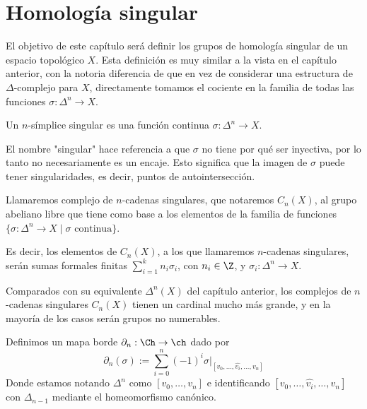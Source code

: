 \chapter{Homología singular}

El objetivo de este capítulo será definir los grupos de homología singular de un espacio topológico $X$. Esta definición es muy similar a la vista en el capítulo anterior, con la notoria diferencia de que en vez de considerar una estructura de $\Delta$-complejo para $X$, directamente tomamos el cociente en la familia de todas las funciones $\sigma:\Delta^n\to X$.

\begin{df}
    Un $n$-símplice singular es una función continua $\sigma:\Delta^n\to X$.
\end{df}

El nombre "singular" hace referencia a que $\sigma$ no tiene por qué ser inyectiva, por lo tanto no necesariamente es un encaje. Esto significa que la imagen de $\sigma$ puede tener singularidades, es decir, puntos de autointersección. \br


\begin{df}
    Llamaremos complejo de $n$-cadenas singulares, que notaremos $C_n(X)$, al grupo abeliano libre que tiene como base a los elementos de la familia de funciones $\{\sigma:\Delta^n\to X \;\vert\; \sigma \text{ continua}\}$. \br

    Es decir, los elementos de $C_n(X)$, a los que llamaremos $n$-cadenas singulares, serán sumas formales finitas $\sum_{i=1}^k n_i\sigma_i$, con $n_i\in\Z$, y $\sigma_i:\Delta^n\to X$.
\end{df}

Comparados con su equivalente $\Delta^n(X)$ del capítulo anterior, los complejos de $n$-cadenas singulares $C_n(X)$ tienen un cardinal mucho más grande, y en la mayoría de los casos serán  grupos no numerables. \br

\begin{df}
    Definimos un mapa borde $\partial_n:\Ch\to\ch$ dado por $$\partial_n(\sigma):= \sum\limits_{i=0}^{n}(-1)^i \sigma |_{[v_0,\dots,\hat{v_i},\dots,v_n]}$$ 
    Donde estamos notando $\Delta^n$ como $[v_0,\dots,v_n]$ e identificando $[v_0,\dots,\hat{v_i},\dots,v_n]$ con $\Delta_{n-1}$ mediante el homeomorfismo canónico.
\end{df}

